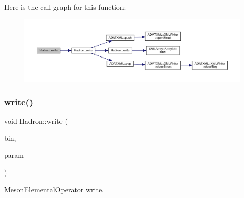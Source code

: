 Here is the call graph for this function\+:\nopagebreak
\begin{figure}[H]
\begin{center}
\leavevmode
\includegraphics[width=350pt]{d1/daf/namespaceHadron_a97d7de65e3fea244c875c2cb76decfda_cgraph}
\end{center}
\end{figure}
\mbox{\label{namespaceHadron_af16b79349f97386286cfc1cd9dfb73f0}} 
\subsubsection{\texorpdfstring{write()}{write()}\hspace{0.1cm}{\footnotesize\ttfamily [63/95]}}
{\footnotesize\ttfamily void Hadron\+::write (\begin{DoxyParamCaption}\item[{\mbox{\hyperlink{classADATIO_1_1BinaryWriter}{Binary\+Writer}} \&}]{bin,  }\item[{const \mbox{\hyperlink{structHadron_1_1ValMesonElementalOperator__t}{Val\+Meson\+Elemental\+Operator\+\_\+t}} \&}]{param }\end{DoxyParamCaption})}



Meson\+Elemental\+Operator write. 

